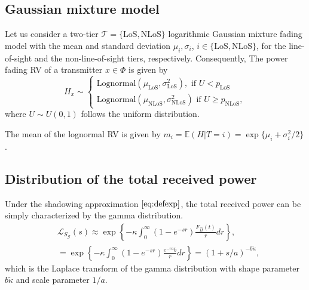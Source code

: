 \documentclass[conference]{IEEEtran}
\theoremstyle{definition}
\theoremstyle{plain}
\begin{document}
          \subsection{Gaussian mixture model}
          Let us consider a two-tier $\mathcal{T} = \{\text{LoS},\text{NLoS}\}$ logarithmic Gaussian mixture fading model with the mean and standard deviation $\mu_{i},\sigma_{i}$, $i \in \{\text{LoS},\text{NLoS} \}$, for the line-of-sight and the non-line-of-sight tiers, respectively. Consequently, The power fading RV of a transmitter $x \in \Phi$ is given by
            \begin{equation}
            H_x \sim
            \begin{cases}
               \text{Lognormal}(\mu_{\text{LoS}},\sigma_{\text{LoS}}^2), \text{ if } U<p_{\text{LoS}} \\
               \text{Lognormal}(\mu_{\text{NLoS}},\sigma_{\text{NLoS}}^2)\text{ if } U \geq p_{\text{NLoS}},              \label{eq:tier2lognormal}
            \end{cases}
            \end{equation}
            where $U \sim U(0,1)$ follows the uniform distribution.
            
            The mean of the lognormal RV is given by $ m_i=\mathbb{E}(H|T=i) = \exp \{\mu_i+\sigma_i^2/2\}$.
            



            \subsection{Distribution of the total received power}
             Under the shadowing approximation $\eqref{eq:defexp}$, the total received power can be simply characterized by the gamma distribution.
          \begin{align}
            \label{eq:lapexp}
            &\mathcal{L}_{S_{\mathcal{G}}}(s) \approx \exp\left\{-\mathcal{\kappa}\int_0^{\infty}(1-e^{-sr})\frac{F_{\hat{H}}(t)}{r} dr \right\}, \nonumber \\
            &= \exp\left\{-\mathcal{\kappa}\int_0^{\infty}(1-e^{-sr})\frac{e^{-ra}b}{r} dr \right\}=(1+s/a)^{-b\tilde{\kappa}}, 
          \end{align}
          which is the Laplace transform of the gamma distribution with shape parameter $b\tilde{\kappa}$ and scale parameter $1/a$.
\end{document}
